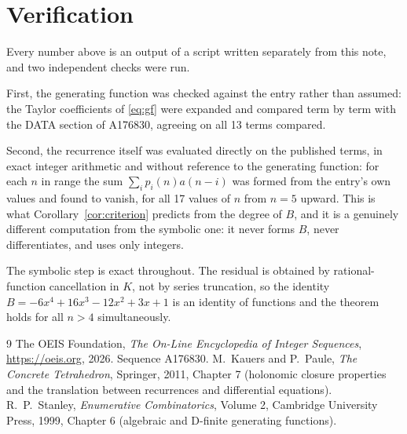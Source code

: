 \documentclass[11pt,a4paper]{article}
\theoremstyle{plain}
\theoremstyle{definition}
\begin{document}
\section{Verification}

Every number above is an output of a script written separately from this note, and two
independent checks were run.

First, the generating function was checked against the entry rather than assumed: the
Taylor coefficients of \eqref{eq:gf} were expanded and compared term by term with the DATA
section of A176830, agreeing on all 13 terms compared.

Second, the recurrence itself was evaluated directly on the published terms, in exact
integer arithmetic and without reference to the generating function: for each $n$ in range
the sum $\sum_{i}p_{i}(n)a(n-i)$ was formed from the entry's own values and found to
vanish, for all 17 values of $n$ from $n=5$ upward. This is what
Corollary~\ref{cor:criterion} predicts from the degree of $B$, and it is a genuinely
different computation from the symbolic one: it never forms $B$, never differentiates, and
uses only integers.

The symbolic step is exact throughout. The residual is obtained by rational-function
cancellation in $K$, not by series truncation, so the identity $B=- 6 x^{4} + 16 x^{3} - 12 x^{2} + 3 x + 1$ is an
identity of functions and the theorem holds for all $n>4$ simultaneously.

\begin{thebibliography}{9}
 The OEIS Foundation, \emph{The On-Line Encyclopedia of Integer Sequences},
\url{https://oeis.org}, 2026. Sequence A176830.
 M.~Kauers and P.~Paule, \emph{The Concrete Tetrahedron}, Springer, 2011,
Chapter 7 (holonomic closure properties and the translation between recurrences and
differential equations).
 R.~P.~Stanley, \emph{Enumerative Combinatorics}, Volume 2, Cambridge
University Press, 1999, Chapter 6 (algebraic and D-finite generating functions).
\end{thebibliography}
\end{document}
